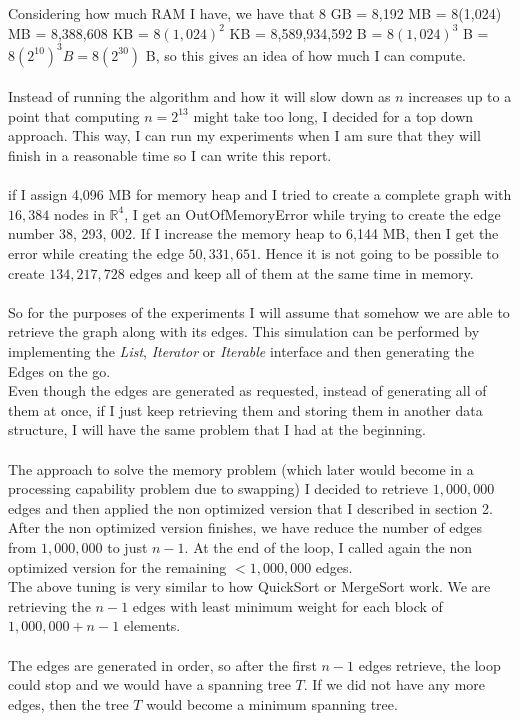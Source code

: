 \documentclass[tikz, 12pt]{scrartcl}
\begin{document}
Considering how much RAM I have, we have that 8 GB = 8,192 MB = 8(1,024) MB = 8,388,608 KB = $8(1,024)^2$ KB = 8,589,934,592 B = $8(1,024)^3$ B = $8 (2^{10})^3 B = 8(2^{30})$ B, so this gives an idea of how much I can compute.\\
\\
Instead of running the algorithm and how it will slow down as $n$ increases up to a point that computing $n = 2^13$ might take too long, I decided for a top down approach. This way, I can run my experiments when I am sure that they will finish in a reasonable time so I can write this report.\\
\\
if I assign 4,096 MB for memory heap and I tried to create a complete graph with $16,384$ nodes in $\mathbb{R}^4$, I get an OutOfMemoryError while trying to create the edge number 38, 293, 002. If I increase the memory heap to 6,144 MB, then I get the error while creating the edge $50,331,651$. Hence it is not going to be possible to create $134,217,728$ edges and keep all of them at the same time in memory. \\
\\
So for the purposes of the experiments I will assume that somehow we are able to retrieve the graph along with its edges. This simulation can be performed by implementing the \textit{List}, \textit{Iterator} or \textit{Iterable} interface and then generating the Edges on the go.\\
Even though the edges are generated as requested, instead of generating all of them at once, if I just keep retrieving them and storing them in another data structure, I will have the same problem that I had at the beginning.\\
\\
The approach to solve the memory problem (which later would become in a processing capability problem due to swapping) I decided to retrieve $1,000,000$ edges and then applied the non optimized version that I described in section 2. After the non optimized version finishes, we have reduce the number of edges from $1,000,000$ to just $n - 1$. At the end of the loop, I called again the non optimized version for the remaining $< 1,000,000$ edges. \\
The above tuning is very similar to how QuickSort or MergeSort work. We are retrieving the $n - 1$ edges with least minimum weight for each block of $1,000, 000 + n - 1$ elements.\\
\\ 
The edges are generated in order, so after the first $n - 1$ edges retrieve, the loop could stop and we would have a spanning tree $T$. If we did not have any more edges, then the tree $T$ would become a minimum spanning tree.\\
\end{document}
